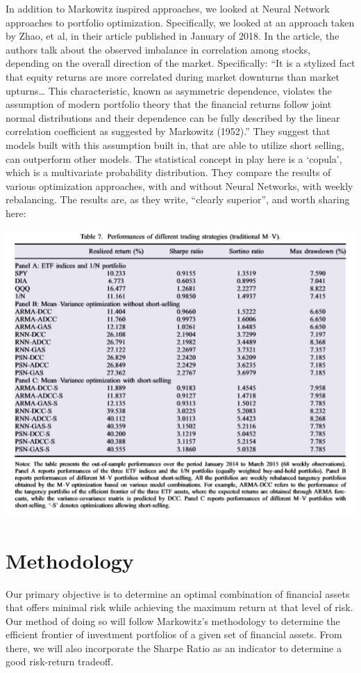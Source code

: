 \documentclass[11pt]{article} %
\begin{document}
In addition to Markowitz inspired approaches, we looked at Neural Network approaches to portfolio optimization. Specifically, we looked at an approach taken by Zhao, et al, in their article published in January of 2018. In the article, the authors talk about the observed imbalance in correlation among stocks, depending on the overall direction of the market. Specifically: ``It is a stylized fact that equity returns are more correlated during market downturns than market upturns… This characteristic, known as asymmetric dependence, violates the assumption of modern portfolio theory that the financial returns follow joint normal distributions and their dependence can be fully described by the linear correlation coefficient as suggested by Markowitz (1952).” \cite{zhao} They suggest that models built with this assumption built in, that are able to utilize short selling, can outperform other models. The statistical concept in play here is a ‘copula’, which is a multivariate probability distribution. They compare the results of various optimization approaches, with and without Neural Networks, with weekly rebalancing. The results are, as they write, ``clearly superior”, and worth sharing here:

\includegraphics[width=\textwidth]{table1}

 
\section{Methodology}

Our primary objective is to determine an optimal combination of financial assets that offers minimal risk while achieving the maximum return at that level of risk. Our method of doing so will follow Markowitz’s methodology to determine the efficient frontier of investment portfolios of a given set of financial assets. From there, we will also incorporate the Sharpe Ratio \cite{sharpe66} as an indicator to determine a good risk-return tradeoff.
\end{document}
